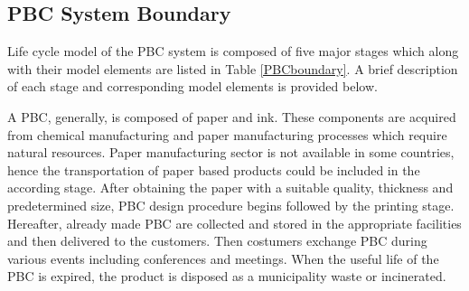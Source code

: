 \documentclass[conference]{IEEEtran}
\begin{document}
\subsection{PBC System Boundary} \label{PBCBoundary}
Life cycle model of the PBC system is composed of five major stages which along with their model elements are listed in Table \ref{PBCboundary}. A brief description of each stage and corresponding model elements is provided below.

A PBC, generally, is composed of paper and ink. These components are acquired from chemical manufacturing and paper manufacturing processes which require natural resources. Paper manufacturing sector is not available in some countries, hence the transportation of paper based products could be included in the according stage. After obtaining the paper with a suitable quality, thickness and predetermined size, PBC design procedure begins followed by the printing stage. Hereafter, already made PBC are collected and stored in the appropriate facilities and then delivered to the customers. Then costumers exchange PBC during various events including conferences and meetings. When the useful life of the PBC is expired, the product is disposed as a municipality waste or incinerated.   

\end{document}
